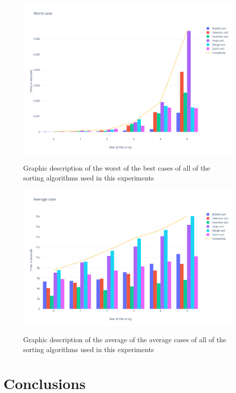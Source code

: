 \documentclass{article}
\begin{document}
\begin{figure}[htp]
	\centering
	\caption{Graphic description of the worst of the best cases of all of the sorting algorithms used in this experiments}
	\includegraphics[width=\linewidth]{Worstcase.png}
	\label{ima8}
\end{figure}

\begin{figure}[htp]
	\centering
	\caption{Graphic description of the average of the average cases of all of the sorting algorithms used in this experiments}
	\includegraphics[width=\linewidth]{Averagecase.png}
	\label{ima9}
\end{figure}

 \section{Conclusions} 
 
\end{document}
